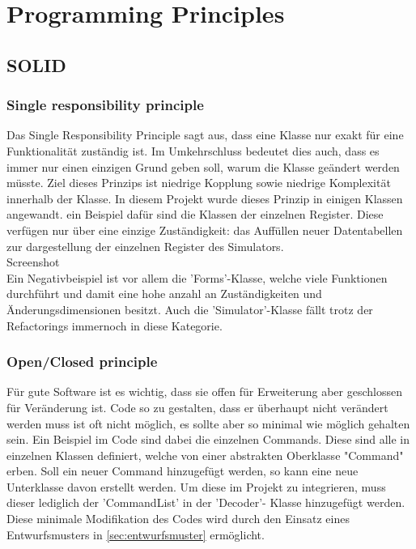 \documentclass[12pt,a4paper,titlepage,ngerman,pdftex]{report}
\begin{document}
    \section{Programming Principles}

    \subsection{SOLID}\label{subsec:solid}
    
    \subsubsection{Single responsibility principle}\label{subsubsec:single_responsibility}
    Das Single Responsibility Principle sagt aus, dass eine Klasse nur exakt für eine Funktionalität zuständig ist. Im Umkehrschluss bedeutet dies auch, dass es immer nur einen einzigen Grund geben soll, warum die Klasse geändert werden müsste.
    Ziel dieses Prinzips ist niedrige Kopplung sowie niedrige Komplexität innerhalb der Klasse. In diesem Projekt wurde dieses Prinzip in einigen Klassen angewandt. ein Beispiel dafür sind die Klassen der einzelnen Register. 
    Diese verfügen nur über eine einzige Zuständigkeit: das Auffüllen neuer Datentabellen zur dargestellung der einzelnen Register des Simulators.
    \\
    Screenshot
    \\

    Ein Negativbeispiel ist vor allem die 'Forms'-Klasse, welche viele Funktionen durchführt und damit eine hohe anzahl an Zuständigkeiten und Änderungsdimensionen besitzt. Auch die 'Simulator'-Klasse fällt trotz der Refactorings immernoch in diese Kategorie. 



    \subsubsection{Open/Closed principle}
    Für gute Software ist es wichtig, dass sie offen für Erweiterung aber geschlossen für Veränderung ist. Code so zu gestalten, dass er überhaupt nicht verändert werden muss ist oft nicht möglich, es sollte aber so minimal wie möglich gehalten sein. Ein Beispiel im Code sind dabei die einzelnen Commands.
    Diese sind alle in einzelnen Klassen definiert, welche von einer abstrakten Oberklasse "Command" erben. Soll ein neuer Command hinzugefügt werden, so kann eine neue Unterklasse davon erstellt werden. Um diese im Projekt zu integrieren, muss dieser lediglich der 'CommandList' in der 'Decoder'- Klasse hinzugefügt werden.
    Diese minimale Modifikation des Codes wird durch den Einsatz eines Entwurfsmusters in \autoref{sec:entwurfsmuster} ermöglicht. 
\end{document}
